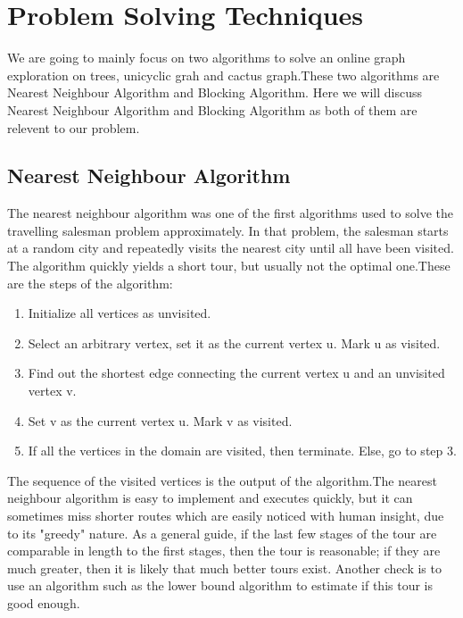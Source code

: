 \documentclass{report}
\begin{document}
    \chapter{Problem Solving Techniques}
    We are going to mainly focus on two algorithms to solve an online graph exploration on trees, unicyclic grah and cactus graph.These two algorithms are Nearest Neighbour Algorithm and Blocking Algorithm. Here we will discuss Nearest Neighbour Algorithm and Blocking Algorithm as both of them are relevent to our problem.
    \section{Nearest Neighbour Algorithm}
    The nearest neighbour algorithm was one of the first algorithms used to solve the travelling salesman problem approximately. In that problem, the salesman starts at a random city and repeatedly visits the nearest city until all have been visited. The algorithm quickly yields a short tour, but usually not the optimal one.These are the steps of the algorithm:
    \begin{enumerate}
        \item Initialize all vertices as unvisited.
        \item Select an arbitrary vertex, set it as the current vertex u. Mark u as visited.
        \item Find out the shortest edge connecting the current vertex u and an unvisited vertex v.
        \item Set v as the current vertex u. Mark v as visited.
        \item If all the vertices in the domain are visited, then terminate. Else, go to step 3.
    \end{enumerate}
    The sequence of the visited vertices is the output of the algorithm.The nearest neighbour algorithm is easy to implement and executes quickly, but it can sometimes miss shorter routes which are easily noticed with human insight, due to its "greedy" nature. As a general guide, if the last few stages of the tour are comparable in length to the first stages, then the tour is reasonable; if they are much greater, then it is likely that much better tours exist. Another check is to use an algorithm such as the lower bound algorithm to estimate if this tour is good enough.
\end{document}
